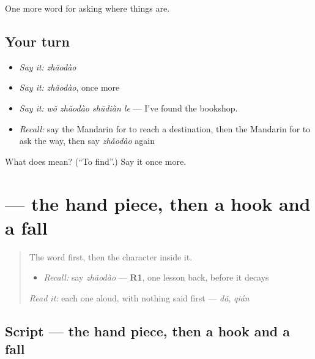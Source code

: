 \begin{grammarlens}[title={What you've built}]
One more word for asking where things are.
\end{grammarlens}

\subsection*{Your turn}
\begin{itemize}
\raggedright
  \item \emph{Say it:} \emph{zhǎodào}
  \item \emph{Say it:} \emph{zhǎodào}, once more
  \item \emph{Say it:} \emph{wǒ zhǎodào shūdiàn le} — I've found the bookshop.
  \item \emph{Recall:} say the Mandarin for to reach a destination, then the Mandarin for to ask the way, then say \emph{zhǎodào} again
\end{itemize}

\begin{tcolorbox}[breakable,colback=teal!4,colframe=teal!35!black,title={Before you move on}]
What does  mean? (\textquotedblleft{}To find\textquotedblright{}.) Say it once more.
\end{tcolorbox}
\section[\texorpdfstring{\zh{找} (zhǎo)}{找 (zhǎo)}]{ — the hand piece, then a hook and a fall}

\label{lesson:ZH-W197-zhao-seek}



\begin{quote}
The word first, then the character inside it.

\begin{itemize}
\raggedright
  \item \emph{Recall:} say \emph{zhǎodào} — \textbf{R1}, one lesson back, before it decays
\end{itemize}

\begin{quote}
 
\end{quote}

\emph{Read it:} each one aloud, with nothing said first — \emph{dǎ}, \emph{qián}
\end{quote}

\subsection*{Script — the hand piece, then a hook and a fall}

